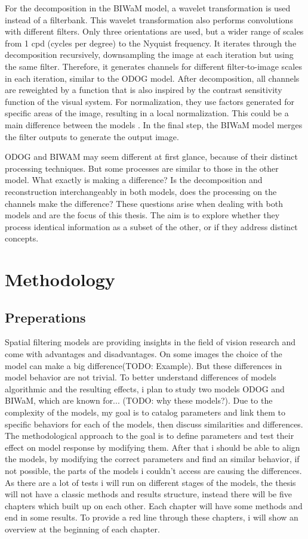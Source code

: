 For the decomposition in the BIWaM model, a wavelet transformation is used instead of a
filterbank. This wavelet transformation also performs convolutions with different filters.
Only three orientations are used, but a wider range of scales from 1 cpd (cycles per
degree) to the Nyquist frequency. It iterates through the decomposition recursively,
downsampling the image at each iteration but using the same filter. Therefore, it
generates channels for different filter-to-image scales in each iteration, similar to the
ODOG model. After decomposition, all channels are reweighted by a function that is also
inspired by the contrast sensitivity function of the visual system. For normalization,
they use factors generated for specific areas of the image, resulting in a local
normalization. This could be a main difference between the models \parencite{Betz2015}. In
the final step, the BIWaM model merges the filter outputs to generate the output image.


ODOG and BIWAM may seem different at first glance, because of their distinct processing
techniques. But some processes are similar to those in the other model. What exactly is
making a difference? Is the decomposition and reconstruction interchangeably in both
models, does the processing on the channels make the difference? These questions arise
when dealing with both models and are the focus of this thesis.  The aim is to explore
whether they process identical information as a subset of the other, or if they address
distinct concepts.

\newpage


\section{Methodology}

\subsection*{Preperations}
Spatial filtering models are providing insights in the field of vision research and come
with advantages and disadvantages. On some images the choice of the model can make a big
difference(TODO: Example). But these differences in model behavior are not trivial. To
better understand differences of models algorithmic and the resulting effects, i plan to
study two models ODOG and BIWaM, which are known for... (TODO: why these models?). Due to
the complexity of the models, my goal is to catalog parameters and link them to specific
behaviors for each of the models, then discuss similarities and differences. The
methodological approach to the goal is to define parameters and test their effect on model
response by modifying them. After that i should be able to align the models, by modifying
the correct parameters and find an similar behavior, if not possible, the parts of the
models i couldn't access are causing the differences. As there are a lot of tests i will
run on different stages of the models, the thesis will not have a classic methods and
results structure, instead there will be five chapters which built up on each other. Each
chapter will have some methods and end in some results. To provide a red line through
these chapters, i will show an overview at the beginning of each chapter.

